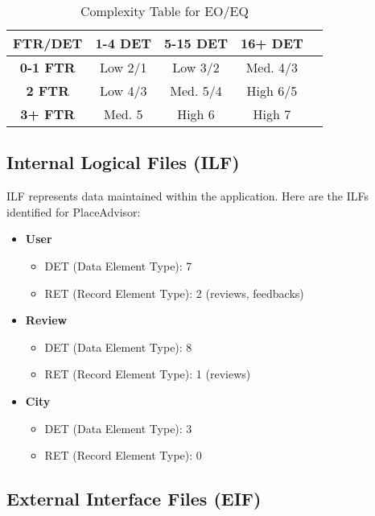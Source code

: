 \documentclass[../main.tex]{subfiles}
\begin{document}
\begin{table}[h]
\centering
\begin{tabular}{|c|c|c|c|c|}
\hline
\textbf{FTR/DET} & \textbf{1-4 DET} & \textbf{5-15 DET} & \textbf{16+ DET} \\
\hline
\textbf{0-1 FTR} & Low 2/1 & Low 3/2 & Med. 4/3 \\
\textbf{2 FTR} & Low 4/3 & Med. 5/4 & High 6/5 \\
\textbf{3+ FTR} & Med. 5 & High 6 & High 7 \\
\hline
\end{tabular}
\caption{Complexity Table for EO/EQ}
\end{table}

\pagebreak


\subsection{Internal Logical Files (ILF)}

ILF represents data maintained within the application. Here are the ILFs identified for PlaceAdvisor:

\begin{itemize}
  \item \textbf{User}
    \begin{itemize}
      \item DET (Data Element Type): 7
      \item RET (Record Element Type): 2 (reviews, feedbacks)
    \end{itemize}

  \item \textbf{Review}
    \begin{itemize}
      \item DET (Data Element Type): 8
      \item RET (Record Element Type): 1 (reviews)
    \end{itemize}

  \item \textbf{City}
    \begin{itemize}
      \item DET (Data Element Type): 3
      \item RET (Record Element Type): 0
    \end{itemize}
\end{itemize}

\subsection{External Interface Files (EIF)}
\end{document}
